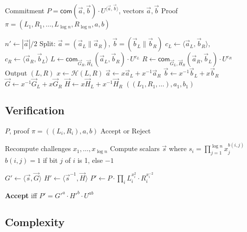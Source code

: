 \documentclass[11pt,a4paper]{article}
\newcommand{\com}{\mathsf{com}}
\begin{document}
\begin{algorithm}
\caption{Inner Product Argument}
\label{alg:ipa}
\begin{algorithmic}[1]
\Require Commitment $P = \com(\vec{a}, \vec{b}) \cdot U^{\langle \vec{a}, \vec{b} \rangle}$, vectors $\vec{a}, \vec{b}$
\Ensure Proof $\pi = (L_1, R_1, \ldots, L_{\log n}, R_{\log n}, a, b)$

    \State $n' \gets |\vec{a}|/2$
    \State Split: $\vec{a} = (\vec{a}_L \| \vec{a}_R)$, $\vec{b} = (\vec{b}_L \| \vec{b}_R)$
    \State $c_L \gets \langle \vec{a}_L, \vec{b}_R \rangle$, $c_R \gets \langle \vec{a}_R, \vec{b}_L \rangle$
    \State $L \gets \com_{\vec{G}_R, \vec{H}_L}(\vec{a}_L, \vec{b}_R) \cdot U^{c_L}$
    \State $R \gets \com_{\vec{G}_L, \vec{H}_R}(\vec{a}_R, \vec{b}_L) \cdot U^{c_R}$
    \State Output $(L, R)$
    \State $x \gets \mathcal{H}(L, R)$
    \State $\vec{a} \gets x \vec{a}_L + x^{-1} \vec{a}_R$
    \State $\vec{b} \gets x^{-1} \vec{b}_L + x \vec{b}_R$
    \State $\vec{G} \gets x^{-1} \vec{G}_L + x \vec{G}_R$
    \State $\vec{H} \gets x \vec{H}_L + x^{-1} \vec{H}_R$
\EndWhile
\State \Return $((L_1, R_1, \ldots), a_1, b_1)$
\end{algorithmic}
\end{algorithm}

\subsection{Verification}

\begin{algorithm}
\caption{IPA Verification}
\label{alg:ipa-verify}
\begin{algorithmic}[1]
\Require $P$, proof $\pi = ((L_i, R_i), a, b)$
\Ensure Accept or Reject

\State Recompute challenges $x_1, \ldots, x_{\log n}$
\State Compute scalars $\vec{s}$ where $s_i = \prod_{j=1}^{\log n} x_j^{b(i,j)}$
\State $b(i, j) = 1$ if bit $j$ of $i$ is 1, else $-1$

\State $G' \gets \langle \vec{s}, \vec{G} \rangle$ 
\State $H' \gets \langle \vec{s}^{-1}, \vec{H} \rangle$
\State $P' \gets P \cdot \prod_i L_i^{x_i^2} \cdot R_i^{x_i^{-2}}$

\State \textbf{Accept} iff $P' = G'^a \cdot H'^b \cdot U^{ab}$
\end{algorithmic}
\end{algorithm}

\subsection{Complexity}
\end{document}
